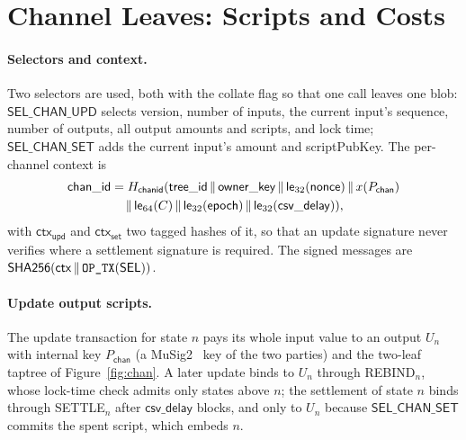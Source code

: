 \section{Channel Leaves: Scripts and Costs}\label{app:channels}

\paragraph{Selectors and context.} Two  selectors are used, both
with the collate flag so that one call leaves one blob:
$\mathsf{SEL\_CHAN\_UPD}$ selects version, number of inputs, the current
input's sequence, number of outputs, all output amounts and scripts, and
lock time; $\mathsf{SEL\_CHAN\_SET}$ adds the current input's amount and
scriptPubKey. The per-channel context is
\begin{multline*}
\mathsf{chan\_id} = H_{\mathsf{chanid}}(\mathsf{tree\_id} \,\|\, \mathsf{owner\_key} \,\|\, \mathsf{le}_{32}(\mathsf{nonce}) \,\|\, x(P_{\mathsf{chan}}) \\
\,\|\, \mathsf{le}_{64}(C) \,\|\, \mathsf{le}_{32}(\mathsf{epoch}) \,\|\, \mathsf{le}_{32}(\mathsf{csv\_delay})),
\end{multline*}
with $\mathsf{ctx}_{\mathsf{upd}}$ and $\mathsf{ctx}_{\mathsf{set}}$ two
tagged hashes of it, so that an update signature never verifies where a
settlement signature is required. The signed messages are
$\mathsf{SHA256}(\mathsf{ctx} \,\|\, \texttt{OP\_TX}(\mathsf{SEL}))$.

\paragraph{Update output scripts.} The update transaction for state $n$
pays its whole input value to an output $U_n$ with internal key
$P_{\mathsf{chan}}$ (a MuSig2~\cite{musig2,bip327} key of the two parties)
and the two-leaf taptree of Figure~\ref{fig:chan}. A later update binds to
$U_n$ through \textsf{REBIND}$_n$, whose lock-time check admits only
states above $n$; the settlement of state $n$ binds through
\textsf{SETTLE}$_n$ after $\mathsf{csv\_delay}$ blocks, and only to $U_n$
because $\mathsf{SEL\_CHAN\_SET}$ commits the spent script, which embeds
$n$.

